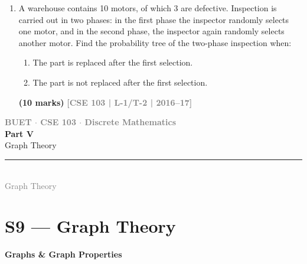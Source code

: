 \documentclass[12pt,a3paper]{article}
\newcommand{\yr}[1]{\hfill\textcolor{gray}{\small\textbf{[#1]}}}
\newcommand{\mk}[1]{\textcolor{orange!70!black}{\small\textbf{(#1 marks)}}}
\newcommand{\subtopic}[2]{%
  \vspace{10pt}
  \noindent\begin{tcolorbox}[colback=#1!8,colframe=#1,boxrule=0.6pt,arc=4pt,
    left=6pt,right=6pt,top=4pt,bottom=4pt]
    \small\bfseries\textcolor{#1}{#2}
  \end{tcolorbox}
  \vspace{2pt}
}
\newcommand{\secdivider}[4]{%
  \newpage\thispagestyle{empty}%
  \vspace*{\fill}%
  \begin{tcolorbox}[enhanced,colback=#4!7,colframe=#3,boxrule=1.5pt,arc=8pt,
    left=20pt,right=20pt,top=22pt,bottom=22pt,
    shadow={3pt}{-3pt}{0pt}{black!15}]
    \centering
    {\large\textcolor{gray}{\textbf{BUET $\cdot$ CSE 103 $\cdot$ Discrete Mathematics}}}\\[8pt]
    {\fontsize{26}{32}\selectfont\bfseries\textcolor{#3}{#1}}\\[6pt]
    {\fontsize{15}{19}\selectfont\textcolor{dgray}{#2}}\\[12pt]
    \textcolor{#3!60}{\rule{0.5\textwidth}{0.5pt}}\\[6pt]
    {\small\textcolor{gray}{#2}}
  \end{tcolorbox}%
  \vspace*{\fill}\newpage%
}
\begin{document}
\begin{enumerate}
\item A warehouse contains 10 motors, of which 3 are defective. Inspection is carried out in two phases: in the first phase the inspector randomly selects one motor, and in the second phase, the inspector again randomly selects another motor. Find the probability tree of the two-phase inspection when:
\begin{enumerate}
  \item The part is replaced after the first selection.
  \item The part is not replaced after the first selection.
\end{enumerate}
\mk{10} \yr{CSE 103 | L-1/T-2 | 2016--17}

\end{enumerate}

\secdivider{Part V}{Graph Theory}{cE}{cE}

\section{S9 --- Graph Theory}
\label{sec:S9}

\subtopic{cE}{Graphs \& Graph Properties}
\label{sub:s9-graphs}
\end{document}
